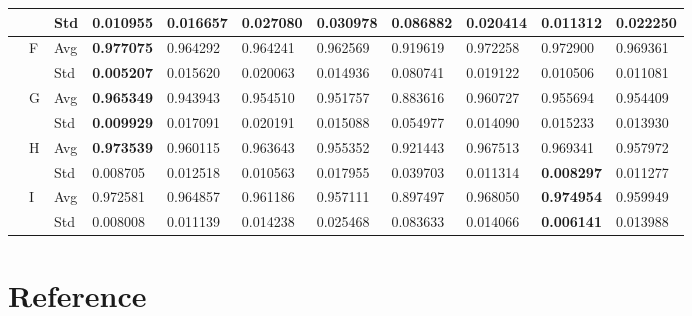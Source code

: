 \documentclass{article} %
\begin{document}
\begin{tabular}{|p{0.4in}|p{0.4in}|p{0.3in}|p{0.5in}|p{0.5in}|p{0.5in}|p{0.5in}|p{0.5in}|p{0.5in}|p{0.5in}|p{0.5in}|}
 &  & Std & \textbf{0.010955 } & 0.016657  & 0.027080  & 0.030978  & 0.086882  & 0.020414  & 0.011312  & 0.022250  \\ \hline 
 & F & Avg & \textbf{0.977075 } & 0.964292  & 0.964241  & 0.962569  & 0.919619  & 0.972258  & 0.972900  & 0.969361  \\ \hline 
 &  & Std & \textbf{0.005207 } & 0.015620  & 0.020063  & 0.014936  & 0.080741  & 0.019122  & 0.010506  & 0.011081  \\ \hline 
 & G & Avg & \textbf{0.965349 } & 0.943943  & 0.954510  & 0.951757  & 0.883616  & 0.960727  & 0.955694  & 0.954409  \\ \hline 
 &  & Std & \textbf{0.009929 } & 0.017091  & 0.020191  & 0.015088  & 0.054977  & 0.014090  & 0.015233  & 0.013930  \\ \hline 
 & H & Avg & \textbf{0.973539 } & 0.960115  & 0.963643  & 0.955352  & 0.921443  & 0.967513  & 0.969341  & 0.957972  \\ \hline 
 &  & Std & 0.008705  & 0.012518  & 0.010563  & 0.017955  & 0.039703  & 0.011314  & \textbf{0.008297 } & 0.011277  \\ \hline 
 & I & Avg & 0.972581  & 0.964857  & 0.961186  & 0.957111  & 0.897497  & 0.968050  & \textbf{0.974954 } & 0.959949  \\ \hline 
 &  & Std & 0.008008  & 0.011139  & 0.014238  & 0.025468  & 0.083633  & 0.014066  & \textbf{0.006141 } & 0.013988  \\ \hline 
\end{tabular}



\noindent 
\section{Reference}
\end{document}
